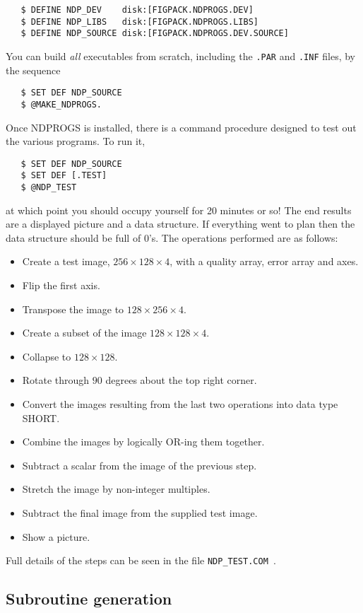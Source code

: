 \begin{verbatim}
   $ DEFINE NDP_DEV    disk:[FIGPACK.NDPROGS.DEV]
   $ DEFINE NDP_LIBS   disk:[FIGPACK.NDPROGS.LIBS]
   $ DEFINE NDP_SOURCE disk:[FIGPACK.NDPROGS.DEV.SOURCE]
\end{verbatim}
You can build {\em all} executables from scratch, including the {\tt .PAR}
and {\tt .INF} files, by the sequence
\begin{verbatim}
   $ SET DEF NDP_SOURCE
   $ @MAKE_NDPROGS.
\end{verbatim}
Once NDPROGS is installed, there is a command procedure designed to test
out the various programs. To run it,
\begin{verbatim}
   $ SET DEF NDP_SOURCE
   $ SET DEF [.TEST]
   $ @NDP_TEST
\end{verbatim}
at which point you should occupy yourself for 20 minutes or so! The end
results are a displayed picture and a data structure. If everything went
to plan then the data structure should be full of $0$'s. The operations 
performed are as follows:
\begin{itemize}
\item Create a test image, $256\times 128\times 4$, with a quality array, error
array and axes.
\item Flip the first axis.
\item Transpose the image to $128\times 256\times 4$.
\item Create a subset of the image $128\times 128\times 4$.
\item Collapse to $128\times 128$.
\item Rotate through $90$ degrees about the top right corner.
\item Convert the images resulting from the last two operations into data
type SHORT.
\item Combine the images by logically OR-ing them together.
\item Subtract a scalar from the image of the previous step.
\item Stretch the image by non-integer multiples.
\item Subtract the final image from the supplied test image.
\item Show a picture.
\end{itemize}
Full details of the steps can be seen in the file {\tt NDP\_TEST.COM }.

\subsection{Subroutine generation}

